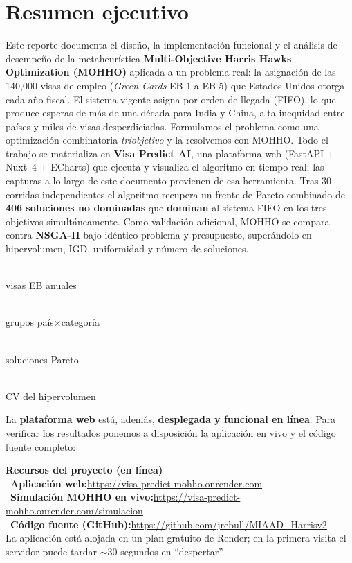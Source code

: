 \documentclass[11pt,letterpaper]{article}
\newcommand{\kpi}[3]{\begin{minipage}[t]{0.235\textwidth}\centering{\fontsize{22}{24}\selectfont\bfseries\color{#3}#1}\\[2pt]{\scriptsize\color{uacjgray}#2}\end{minipage}}
\begin{document}
\section*{Resumen ejecutivo}

Este reporte documenta el diseño, la implementación funcional y el análisis de desempeño de la metaheurística \textbf{Multi-Objective Harris Hawks Optimization (MOHHO)} aplicada a un problema real: la asignación de las 140{,}000 visas de empleo (\textit{Green Cards} EB-1 a EB-5) que Estados Unidos otorga cada año fiscal. El sistema vigente asigna por orden de llegada (FIFO), lo que produce esperas de más de una década para India y China, alta inequidad entre países y miles de visas desperdiciadas. Formulamos el problema como una optimización combinatoria \emph{triobjetivo} y la resolvemos con MOHHO. Todo el trabajo se materializa en \textbf{Visa Predict AI}, una plataforma web (FastAPI + Nuxt~4 + ECharts) que ejecuta y visualiza el algoritmo en tiempo real; las capturas a lo largo de este documento provienen de esa herramienta. Tras 30 corridas independientes el algoritmo recupera un frente de Pareto combinado de \textbf{406 soluciones no dominadas} que \textbf{dominan} al sistema FIFO en los tres objetivos simultáneamente. Como validación adicional, MOHHO se compara contra \textbf{NSGA-II} bajo idéntico problema y presupuesto, superándolo en hipervolumen, IGD, uniformidad y número de soluciones.

\vspace{0.3cm}
\begin{tcolorbox}[colback=headerblue!4,colframe=headerblue!35,arc=4pt,boxrule=0.8pt,top=3mm,bottom=3mm]
\centering
\kpi{140K}{visas EB anuales}{headerblue}\hfill
\kpi{105}{grupos país$\times$categoría}{tablehead}\hfill
\kpi{406}{soluciones Pareto}{sectiongreen}\hfill
\kpi{1.56\%}{CV del hipervolumen}{alertred}
\end{tcolorbox}

\vspace{0.2cm}
La \textbf{plataforma web} está, además, \textbf{desplegada y funcional en línea}. Para verificar los resultados ponemos a disposición la aplicación en vivo y el código fuente completo:

\begin{tcolorbox}[colback=deliverbg,colframe=headerblue,arc=4pt,boxrule=1pt,left=12pt,right=12pt,top=8pt,bottom=8pt]
\raggedright
{\bfseries\color{headerblue} Recursos del proyecto (en línea)}\\[5pt]
~\textbf{Aplicación web:}\quad \url{https://visa-predict-mohho.onrender.com}\\[3pt]
~\textbf{Simulación MOHHO en vivo:}\quad \url{https://visa-predict-mohho.onrender.com/simulacion}\\[3pt]
~\textbf{Código fuente (GitHub):}\quad \url{https://github.com/jrebull/MIAAD_Harrisv2}\\[5pt]
{\footnotesize\color{uacjgray} La aplicación está alojada en un plan gratuito de Render; en la primera visita el servidor puede tardar $\sim$30 segundos en \enquote{despertar}.}
\end{tcolorbox}
\end{document}
